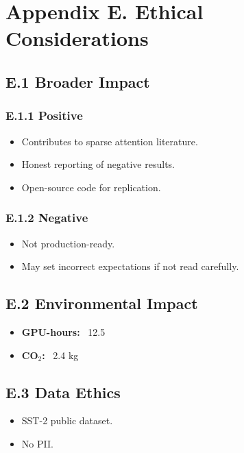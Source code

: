 
\section{Appendix E. Ethical Considerations}

\subsection{E.1 Broader Impact}

\subsubsection{E.1.1 Positive}

\begin{itemize}
\item Contributes to sparse attention literature.
\item Honest reporting of negative results.
\item Open-source code for replication.

\end{itemize}
\subsubsection{E.1.2 Negative}

\begin{itemize}
\item Not production-ready.
\item May set incorrect expectations if not read carefully.

\end{itemize}
\subsection{E.2 Environmental Impact}

\begin{itemize}
\item \textbf{GPU-hours:} ~12.5
\item \textbf{CO$_2$:} ~2.4 kg

\end{itemize}
\subsection{E.3 Data Ethics}

\begin{itemize}
\item SST-2 public dataset.
\item No PII.

\end{itemize}
